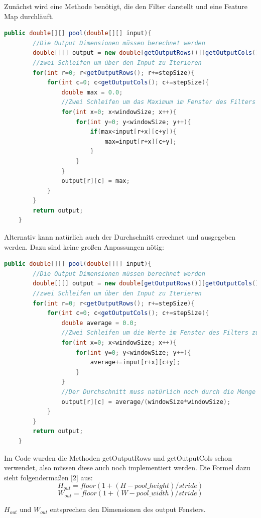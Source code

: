 \documentclass[12pt]{article}
\begin{document}
Zunächst wird eine Methode benötigt, die den Filter darstellt und eine Feature Map durchläuft. 

\begin{lstlisting}[language=Java]
 public double[][] pool(double[][] input){
 		//Die Output Dimensionen müssen berechnet werden
        double[][] output = new double[getOutputRows()][getOutputCols()];
        //zwei Schleifen um über den Input zu Iterieren
        for(int r=0; r<getOutputRows(); r+=stepSize){
            for(int c=0; c<getOutputCols(); c+=stepSize){
                double max = 0.0;
                //Zwei Schleifen um das Maximum im Fenster des Filters zu finden
                for(int x=0; x<windowSize; x++){
                    for(int y=0; y<windowSize; y++){
                        if(max<input[r+x][c+y]){
                            max=input[r+x][c+y];
                        }
                    }
                }
                output[r][c] = max;
            }
        }
        return output;
    }
\end{lstlisting}
Alternativ kann natürlich auch der Durchschnitt errechnet und ausgegeben werden. Dazu sind keine großen Anpassungen nötig:
\begin{lstlisting}[language=Java]
 public double[][] pool(double[][] input){
 		//Die Output Dimensionen müssen berechnet werden
        double[][] output = new double[getOutputRows()][getOutputCols()];
        //zwei Schleifen um über den Input zu Iterieren
        for(int r=0; r<getOutputRows(); r+=stepSize){
            for(int c=0; c<getOutputCols(); c+=stepSize){
                double average = 0.0;
                //Zwei Schleifen um die Werte im Fenster des Filters zu addieren
                for(int x=0; x<windowSize; x++){
                    for(int y=0; y<windowSize; y++){
                    	average+=input[r+x][c+y];
                    }
                }
                //Der Durchschnitt muss natürlich noch durch die Menge der im Filterfenster enthaltenen Pixel geteilt werden
                output[r][c] = average/(windowSize*windowSize);
            }
        }
        return output;
    }
\end{lstlisting}
Im Code wurden die Methoden getOutputRows und getOutputCols schon verwendet, also müssen diese auch noch implementiert werden. Die Formel dazu sieht folgendermaßen [2] aus:
$$H_{out} = floor(1 + (H - pool\_height)/stride)$$
$$W_{out} = floor(1 + (W - pool\_ width)/stride)$$

$H_{out}$ und $W_{out}$ entsprechen den Dimensionen des output Fensters. 
\end{document}
